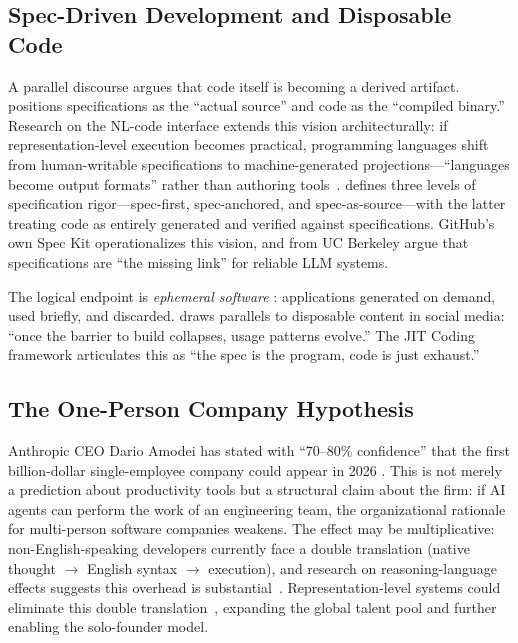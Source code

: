 \documentclass[12pt]{article}
\begin{document}
\subsection{Spec-Driven Development and Disposable Code}

A parallel discourse argues that code itself is becoming a derived artifact. \citet{welch2025disposable} positions specifications as the ``actual source'' and code as the ``compiled binary.'' Research on the NL-code interface extends this vision architecturally: if representation-level execution becomes practical, programming languages shift from human-writable specifications to machine-generated projections---``languages become output formats'' rather than authoring tools~\citep{zgap2026chomsky}. \citet{piskala2026sdd} defines three levels of specification rigor---spec-first, spec-anchored, and spec-as-source---with the latter treating code as entirely generated and verified against specifications. GitHub's own Spec Kit \citep{github2025speckit} operationalizes this vision, and \citet{stoica2024specifications} from UC Berkeley argue that specifications are ``the missing link'' for reliable LLM systems.

The logical endpoint is \textit{ephemeral software} \citep{ellis2025ephemeral, houston2025ephemeral, ali2025ephemeral}: applications generated on demand, used briefly, and discarded. \citet{harel2025disposable} draws parallels to disposable content in social media: ``once the barrier to build collapses, usage patterns evolve.'' The JIT Coding framework \citep{playbooks2025jit} articulates this as ``the spec is the program, code is just exhaust.''

\subsection{The One-Person Company Hypothesis}

Anthropic CEO Dario Amodei has stated with ``70--80\% confidence'' that the first billion-dollar single-employee company could appear in 2026 \citep{nxcode2026unicorn}. This is not merely a prediction about productivity tools but a structural claim about the firm: if AI agents can perform the work of an engineering team, the organizational rationale for multi-person software companies weakens. The effect may be multiplicative: non-English-speaking developers currently face a double translation (native thought $\to$ English syntax $\to$ execution), and research on reasoning-language effects suggests this overhead is substantial~\citep{li2026reasoning}. Representation-level systems could eliminate this double translation~\citep{zgap2026chomsky}, expanding the global talent pool and further enabling the solo-founder model.
\end{document}
